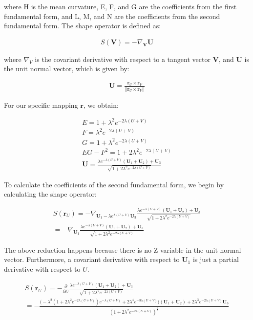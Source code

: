 \documentclass[preprint,12pt]{elsarticle}
\newcounter{bla}
\begin{document}
where H is the mean curvature, E, F, and G are the coefficients from the first fundamental form, and L, M, and N are the coefficients from the second fundamental form. The shape operator is defined as:

\begin{gather}
	S(\mathbf{V}) = -\nabla_{\mathbf{V}} \mathbf{U}
\end{gather}

where $\nabla_{V}$ is the covariant derivative with respect to a tangent vector $\mathbf{V}$, and $\mathbf{U}$ is the unit normal vector, which is given by:

\begin{gather}
	\mathbf{U} = \frac{\mathbf{r}_U \times \mathbf{r}_V}{||\mathbf{r}_U \times \mathbf{r}_V||}
\end{gather}

For our specific mapping $\mathbf{r}$, we obtain:

\begin{gather}
	E = 1 + \lambda^{2} e^{-2\lambda(U + V)} \\
	F = \lambda^{2} e^{-2\lambda(U + V)} \\
	G = 1 + \lambda^{2} e^{-2\lambda(U + V)} \\
	EG - F^{2} = 1 + 2\lambda^{2} e^{-2\lambda(U + V)} \\
	\mathbf{U} = \frac{\lambda e^{-\lambda(U + V)}(\mathbf{U}_1 + \mathbf{U}_2) + \mathbf{U}_3}{\sqrt{1 + 2\lambda^{2} e^{-2\lambda(U + V)}}}
\end{gather}

To calculate the coefficients of the second fundamental form, we begin by calculating the shape operator:

\begin{gather}
	S(\mathbf{r}_U) = -\nabla_{\mathbf{U}_1 - \lambda e^{\lambda(U + V)}\mathbf{U}_3} \frac{\lambda e^{-\lambda(U + V)}(\mathbf{U}_1 + \mathbf{U}_2) + \mathbf{U}_3}{\sqrt{1 + 2\lambda^{2} e^{-2\lambda(U + V)}}} \\
	= -\nabla_{\mathbf{U}_1} \frac{\lambda e^{-\lambda(U + V)}(\mathbf{U}_1 + \mathbf{U}_2) + \mathbf{U}_3}{\sqrt{1 + 2\lambda^{2} e^{-2\lambda(U + V)}}}
\end{gather}

The above reduction happens because there is no Z variable in the unit normal vector. Furthermore, a covariant derivative with respect to $\mathbf{U}_1$ is just a partial derivative with respect to $U$.

\begin{gather}
	S(\mathbf{r}_U) = -\frac{\partial}{\partial U} \frac{\lambda e^{-\lambda(U + V)}(\mathbf{U}_1 + \mathbf{U}_2) + \mathbf{U}_3}{\sqrt{1 + 2\lambda^{2} e^{-2\lambda(U + V)}}} \\
	= -\frac{\big(-\lambda^{2}(1 + 2\lambda^{2}e^{-2\lambda(U+V)})e^{-\lambda(U+V)} + 2\lambda^{4}e^{-3\lambda(U+V)}\big)(\mathbf{U}_1 + \mathbf{U}_2) + 2\lambda^{3}e^{-2\lambda(U+V)}\mathbf{U}_3}{(1 + 2\lambda^{2}e^{-2\lambda(U + V)})^{\frac{3}{2}}}
\end{gather}
\end{document}
